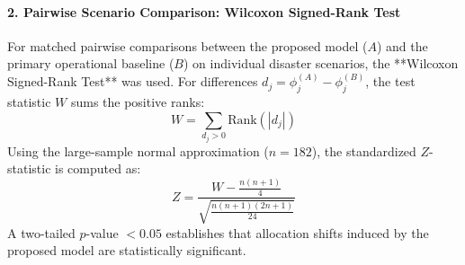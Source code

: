 \paragraph{2. Pairwise Scenario Comparison: Wilcoxon Signed-Rank Test}
For matched pairwise comparisons between the proposed model ($A$) and the primary operational baseline ($B$) on individual disaster scenarios, the **Wilcoxon Signed-Rank Test** was used. For differences $d_j = \phi_j^{(A)} - \phi_j^{(B)}$, the test statistic $W$ sums the positive ranks:
\begin{equation}
    W = \sum_{d_j > 0} \text{Rank}(|d_j|)
\end{equation}
Using the large-sample normal approximation ($n = 182$), the standardized $Z$-statistic is computed as:
\begin{equation}
    Z = \frac{W - \frac{n(n + 1)}{4}}{\sqrt{\frac{n(n + 1)(2n + 1)}{24}}}
\end{equation}
A two-tailed $p$-value $< 0.05$ establishes that allocation shifts induced by the proposed model are statistically significant.
